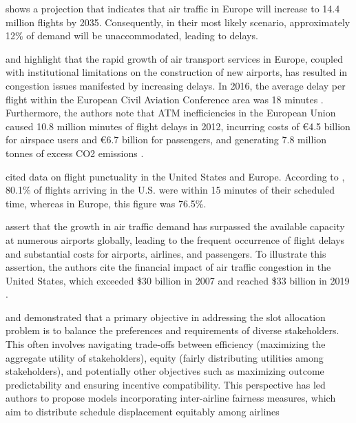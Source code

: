  shows a projection that indicates that air
traffic in Europe will increase to 14.4 million flights by 2035. Consequently,
in their most likely scenario, approximately 12\% of demand will be
unaccommodated, leading to delays.



 and  highlight
that the rapid growth of air transport services in Europe, coupled with
institutional limitations on the construction of new airports, has resulted in
congestion issues manifested by increasing delays.
%
In 2016, the average delay per flight within the European Civil Aviation
Conference area was 18 minutes \cite{Eurocontrol_AnnualReport2016}.
%
Furthermore, the authors note that \acrfull{ATM} inefficiencies in the European
Union caused 10.8 million minutes of flight delays in 2012, incurring costs of
€4.5 billion for airspace users and €6.7 billion for passengers, and generating
7.8 million tonnes of excess CO2 emissions \cite{IATA_SESFactsheet2014a}.



 cited data on flight punctuality in the
United States and Europe.
%
According to , 80.1\% of flights
arriving in the U.S.
%
were within 15 minutes of their scheduled time, whereas in Europe, this figure
was 76.5\%.



 assert that the growth in air traffic
demand has surpassed the available capacity at numerous airports globally,
leading to the frequent occurrence of flight delays and substantial costs for
airports, airlines, and passengers.
%
To illustrate this assertion, the authors cite the financial impact of air
traffic congestion in the United States, which exceeded \$30 billion in 2007
\cite{gillen2016airport, jacquillat_interairline_2018, jacquillat_roadmap_2018,
ribeiro_large-scale_2019} and reached \$33 billion in 2019
\cite{dixit_algorithmic_2023}.



 and
 demonstrated that a primary objective in
addressing the slot allocation problem is to balance the preferences and
requirements of diverse stakeholders.
%
This often involves navigating trade-offs between efficiency (maximizing the
aggregate utility of stakeholders), equity (fairly distributing utilities among
stakeholders), and potentially other objectives such as maximizing outcome
predictability and ensuring incentive compatibility.
%
This perspective has led authors to propose models incorporating inter-airline
fairness measures, which aim to distribute schedule displacement equitably among
airlines \cite{fairbrother2018development, jacquillat_roadmap_2018,
zografos_bi-objective_2019, jiang_decision_2021}



